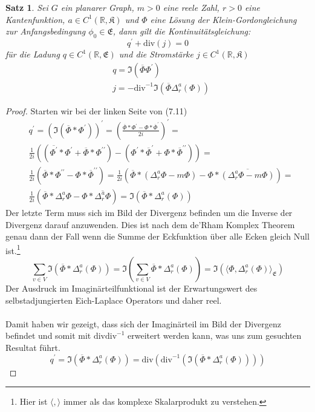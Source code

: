 \documentclass[11pt,a4paper,leqno]{report}
\newtheorem{proposition}{Satz}[chapter]
\numberwithin{equation}{chapter}
\begin{document}
\begin{proposition}
	Sei $G$ ein planarer Graph, $m>0$ eine reele Zahl, $r>0$ eine Kantenfunktion, $a\in C^1(\mathbb{R}, \mathfrak{K})$ und $\Phi$ eine L\"osung der Klein-Gordongleichung zur Anfangsbedingung $\phi_0\in\mathfrak{E}$, dann gilt die Kontinuit\"atsgleichung:
	\begin{equation}
		q^\prime + \text{div}(j) = 0 
	\end{equation}
	f\"ur die Ladung $q\in C^1(\mathbb{R},\mathfrak{E})$ und die Stromst\"arke $j\in C^1(\mathbb{R},\mathfrak{K})$
	\begin{align}
		&q = \Im(\overline{\Phi}\Phi^\prime)\\
		&j = -\text{div}^{-1}\Im(\overline{\Phi}\Delta^a_r(\Phi))
	\end{align}
\end{proposition}
\begin{proof}
Starten wir bei der linken Seite von (7.11)
\begin{align*}
	&q^\prime = (\Im(\overline{\Phi}*\Phi^\prime))^\prime=(\frac{\overline{\Phi}*\Phi^\prime - \Phi*\overline{\Phi}^\prime}{2i})^\prime=\\
	&\frac{1}{2i}((\overline{\Phi^\prime}*\Phi^\prime + \overline{\Phi}*\Phi^{\prime\prime})-(\Phi^\prime*\overline{\Phi}^\prime+\Phi*\overline{\Phi}^{\prime\prime}))=\\
	&\frac{1}{2i}(\overline{\Phi}*\Phi^{\prime\prime}-\Phi*\overline{\Phi}^{\prime\prime})=
	\frac{1}{2i}(\overline{\Phi}*(\Delta^a_r\Phi - m \Phi)-\Phi*\overline{(\Delta^a_r\Phi - m \Phi)})=\\
	&\frac{1}{2i}(\overline{\Phi}*\Delta^a_r\Phi-\Phi*\overline{\Delta^a_r\Phi})=\Im(\overline{\Phi}*\Delta^a_r(\Phi))
\end{align*}
Der letzte Term muss sich im Bild der Divergenz befinden um die Inverse der Divergenz darauf anzuwenden. Dies ist nach dem de'Rham Komplex Theorem genau dann der Fall wenn die Summe der Eckfunktion \"uber alle Ecken gleich Null ist.\footnote{Hier ist $\langle, \rangle$ immer als das komplexe Skalarprodukt zu verstehen.}
\begin{equation*}
	\sum_{v\in V}\Im(\overline{\Phi}*\Delta^a_r(\Phi))=\Im(\sum_{v\in V}\overline{\Phi}*\Delta^a_r(\Phi))=\Im(\langle\Phi, \Delta^a_r(\Phi)\rangle_{\mathfrak{E}})
\end{equation*}
Der Ausdruck im Imagin\"arteilfunktional ist der Erwartungswert des selbstadjungierten Eich-Laplace Operators und daher reel.\\
\\
Damit haben wir gezeigt, dass sich der Imagin\"arteil im Bild der Divergenz befindet und somit mit $\text{div}\text{div}^{-1}$ erweitert werden kann, was uns zum gesuchten Resultat f\"uhrt.
\begin{equation*}
	q^\prime =\Im(\overline{\Phi}*\Delta^a_r(\Phi))=\text{div}(\text{div}^{-1}(\Im(\overline{\Phi}*\Delta^a_r(\Phi))))
\end{equation*}
\end{proof}
\end{document}
